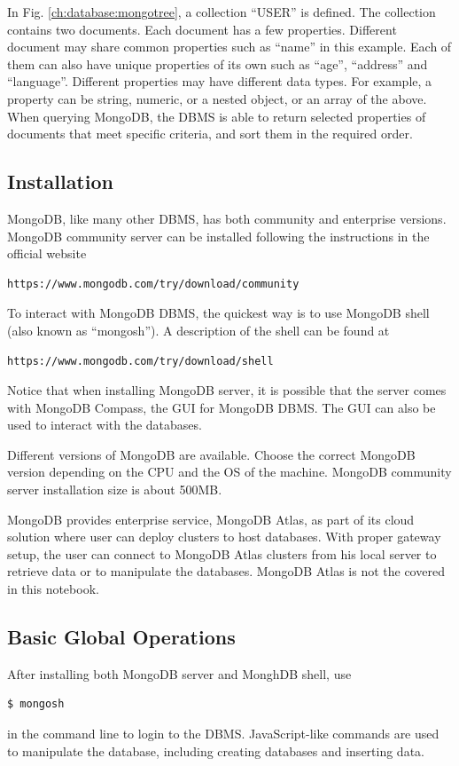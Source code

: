 In Fig. \ref{ch:database:mongotree}, a collection ``USER'' is defined. The collection contains two documents. Each document has a few properties. Different document may share common properties such as ``name'' in this example. Each of them can also have unique properties of its own such as ``age'', ``address'' and ``language''. Different properties may have different data types. For example, a property can be string, numeric, or a nested object, or an array of the above. When querying MongoDB, the DBMS is able to return selected properties of documents that meet specific criteria, and sort them in the required order.

\subsection{Installation}

MongoDB, like many other DBMS, has both community and enterprise versions. MongoDB community server can be installed following the instructions in the official website
\begin{lstlisting}
https://www.mongodb.com/try/download/community
\end{lstlisting}
To interact with MongoDB DBMS, the quickest way is to use MongoDB shell (also known as ``mongosh''). A description of the shell can be found at
\begin{lstlisting}
https://www.mongodb.com/try/download/shell
\end{lstlisting}
Notice that when installing MongoDB server, it is possible that the server comes with MongoDB Compass, the GUI for MongoDB DBMS. The GUI can also be used to interact with the databases.

Different versions of MongoDB are available. Choose the correct MongoDB version depending on the CPU and the OS of the machine. MongoDB community server installation size is about 500MB.

MongoDB provides enterprise service, MongoDB Atlas, as part of its cloud solution where user can deploy clusters to host databases. With proper gateway setup, the user can connect to MongoDB Atlas clusters from his local server to retrieve data or to manipulate the databases. MongoDB Atlas is not the covered in this notebook.

\subsection{Basic Global Operations}

After installing both MongoDB server and MonghDB shell, use
\begin{lstlisting}
$ mongosh
\end{lstlisting}
in the command line to login to the DBMS. JavaScript-like commands are used to manipulate the database, including creating databases and inserting data.

